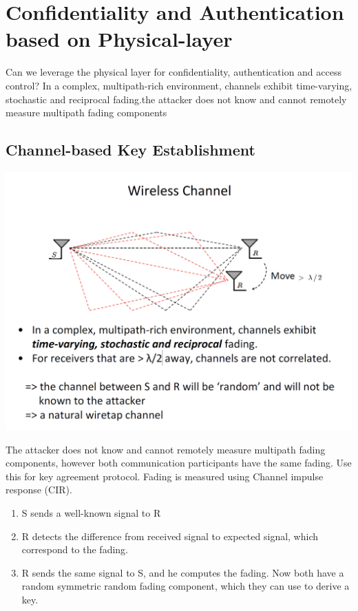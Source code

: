 \section{Confidentiality and Authentication based on Physical-layer}

Can we leverage the physical layer for confidentiality, authentication and access control?
In a complex, multipath-rich environment, channels exhibit time-varying, stochastic and reciprocal fading.the attacker does not know and cannot remotely measure multipath fading components

\subsection{Channel-based Key Establishment}

\begin{minipage}{\linewidth}
    \centering      
    \includegraphics[width=\linewidth]{Figures/L7_channel.PNG}
\end{minipage}

The attacker does not know and cannot remotely measure multipath fading components, however both communication participants have the same fading. Use this for key agreement protocol. Fading is measured using Channel impulse response (CIR).

\begin{enumerate}
    \item S sends a well-known signal to R
    \item R detects the difference from received signal to expected signal, which correspond to the fading.
    \item R sends the same signal to S, and he computes the fading. Now both have a random symmetric random fading component, which they can use to derive a key.
\end{enumerate}

